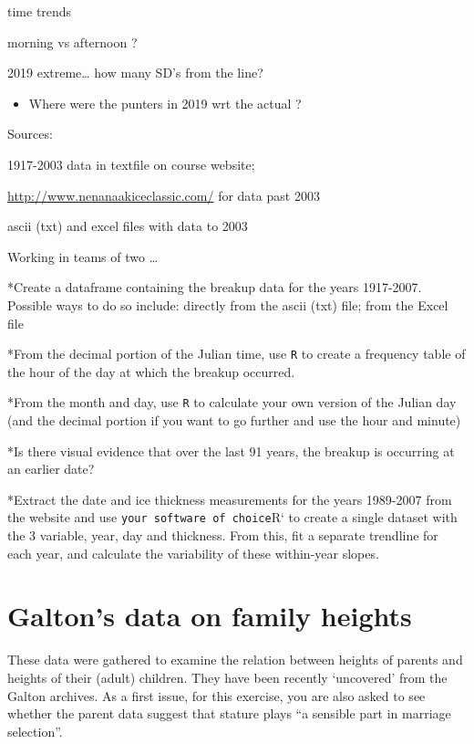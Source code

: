 \documentclass[]{book}
\providecommand{\tightlist}{%
  \setlength{\itemsep}{0pt}\setlength{\parskip}{0pt}}
\begin{document}
time trends

morning vs afternoon ?

2019 extreme\ldots{} how many SD's from the line?

\begin{itemize}
\tightlist
\item
  Where were the punters in 2019 wrt the actual ?
\end{itemize}

Sources:

1917-2003 data in textfile on course website;

\url{http://www.nenanaakiceclassic.com/} for data past 2003

ascii (txt) and excel files with data to 2003

Working in teams of two \ldots{}

*Create a dataframe containing the breakup data for the years 1917-2007. Possible ways to do so include: directly from the ascii (txt) file; from the Excel file

*From the decimal portion of the Julian time, use \texttt{R} to create a frequency table of the hour of the day at which the breakup occurred.

*From the month and day, use \texttt{R} to calculate your own version of the Julian day (and the decimal portion if you want to go further and use the hour and minute)

*Is there visual evidence that over the last 91 years, the breakup is occurring at an earlier date?

*Extract the date and ice thickness measurements for the years 1989-2007 from the website and use \texttt{your\ software\ of\ choice}R` to create a single dataset with the 3 variable, year, day and thickness. From this, fit a separate trendline for each year, and calculate the variability of these within-year slopes.

\hypertarget{galtons-data-on-family-heights-1}{%
\section{Galton's data on family heights}\label{galtons-data-on-family-heights-1}}

These data were gathered to examine the relation between heights of parents and heights of their (adult) children. They have been recently `uncovered' from the Galton archives. As a first issue, for this exercise, you are also asked to see whether the parent data suggest that stature plays ``a sensible part in marriage selection''.
\end{document}
